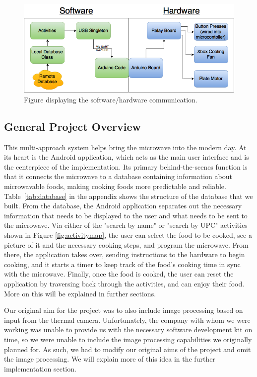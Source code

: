 \documentclass[10pt,journal,letterpaper,twocolumn]{IEEEtran}
\begin{document}
\begin{figure}[ht]
\centering
\includegraphics[width=\textwidth]{HardwareSoftware.png}
\caption{\label{fig:hardwaresoftware}Figure displaying the software/hardware communication.}
\end{figure}

\subsection{General Project Overview}
This multi-approach system helps bring the microwave into the modern day.  At its heart is the Android application, which acts as the main user interface and is the centerpiece of the implementation.  Its primary behind-the-scenes function is that it connects the microwave to a database containing information about microwavable foods, making cooking foods more predictable and reliable.  Table~\ref{tab:database} in the appendix shows the structure of the database that we built.
From the database, the Android application separates out the necessary information that needs to be displayed to the user and what needs to be sent to the microwave.  Via either of the "search by name" or "search by UPC" activities shown in Figure \ref{fig:activitymap}, the user can select the food to be cooked, see a picture of it and the necessary cooking steps, and program the microwave.  From there, the application takes over, sending instructions to the hardware to begin cooking, and it starts a timer to keep track of the food's cooking time in sync with the microwave.  Finally, once the food is cooked, the user can reset the application by traversing back through the activities, and can enjoy their food.  More on this will be explained in further sections.

Our original aim for the project was to also include image processing based on input from the thermal camera.  Unfortunately, the company with whom we were working was unable to provide us with the necessary software development kit on time, so we were unable to include the image processing capabilities we originally planned for.  As such, we had to modify our original aims of the project and omit the image processing.  We will explain more of this idea in the further implementation section.
\end{document}
